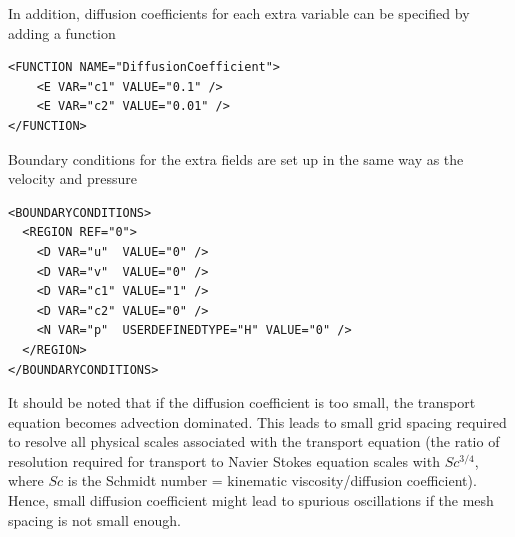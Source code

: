 In addition, diffusion coefficients for each extra variable can be specified by adding a function
\begin{lstlisting}[style=XMLStyle]
<FUNCTION NAME="DiffusionCoefficient">
    <E VAR="c1" VALUE="0.1" />
    <E VAR="c2" VALUE="0.01" />
</FUNCTION>
\end{lstlisting}

Boundary conditions for the extra fields are set up in the same way as the velocity and pressure
\begin{lstlisting}[style=XMLStyle, label=lst:scalarbc]
<BOUNDARYCONDITIONS>
  <REGION REF="0">
    <D VAR="u"  VALUE="0" />
    <D VAR="v"  VALUE="0" />
    <D VAR="c1" VALUE="1" />
    <D VAR="c2" VALUE="0" />
    <N VAR="p"  USERDEFINEDTYPE="H" VALUE="0" />
  </REGION>
</BOUNDARYCONDITIONS>
\end{lstlisting}

It should be noted that if the diffusion coefficient is too small, the transport equation becomes advection dominated.
This leads to small grid spacing required to resolve all physical scales associated with the transport equation
(the ratio of resolution required for transport to Navier Stokes equation scales with $Sc^{3/4}$, where $Sc$ is the
Schmidt number = kinematic viscosity/diffusion coefficient). Hence, small diffusion coefficient might lead to spurious
oscillations if the mesh spacing is not small enough.

